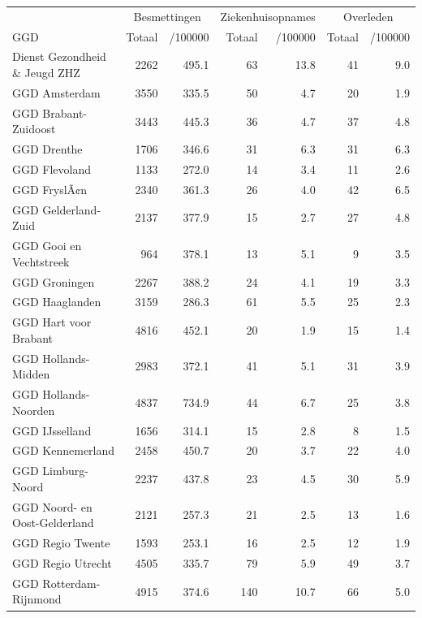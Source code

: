 \documentclass[
  english,
  man,floatsintext]{apa6}
\begin{document}
\begin{table}
\centering\begingroup\fontsize{10}{12}\selectfont

\begin{threeparttable}
\begin{tabular}{lrrrrrr}
\toprule
\multicolumn{1}{c}{ } & \multicolumn{2}{c}{Besmettingen} & \multicolumn{2}{c}{Ziekenhuisopnames} & \multicolumn{2}{c}{Overleden} \\
\cmidrule(l{3pt}r{3pt}){2-3} \cmidrule(l{3pt}r{3pt}){4-5} \cmidrule(l{3pt}r{3pt}){6-7}
GGD & Totaal & /100000 & Totaal & /100000 & Totaal & /100000\\
\midrule
Dienst Gezondheid \& Jeugd ZHZ & 2262 & 495.1 & 63 & 13.8 & 41 & 9.0\\
GGD Amsterdam & 3550 & 335.5 & 50 & 4.7 & 20 & 1.9\\
GGD Brabant-Zuidoost & 3443 & 445.3 & 36 & 4.7 & 37 & 4.8\\
GGD Drenthe & 1706 & 346.6 & 31 & 6.3 & 31 & 6.3\\
GGD Flevoland & 1133 & 272.0 & 14 & 3.4 & 11 & 2.6\\
GGD FryslÃ¢n & 2340 & 361.3 & 26 & 4.0 & 42 & 6.5\\
GGD Gelderland-Zuid & 2137 & 377.9 & 15 & 2.7 & 27 & 4.8\\
GGD Gooi en Vechtstreek & 964 & 378.1 & 13 & 5.1 & 9 & 3.5\\
GGD Groningen & 2267 & 388.2 & 24 & 4.1 & 19 & 3.3\\
GGD Haaglanden & 3159 & 286.3 & 61 & 5.5 & 25 & 2.3\\
GGD Hart voor Brabant & 4816 & 452.1 & 20 & 1.9 & 15 & 1.4\\
GGD Hollands-Midden & 2983 & 372.1 & 41 & 5.1 & 31 & 3.9\\
GGD Hollands-Noorden & 4837 & 734.9 & 44 & 6.7 & 25 & 3.8\\
GGD IJsselland & 1656 & 314.1 & 15 & 2.8 & 8 & 1.5\\
GGD Kennemerland & 2458 & 450.7 & 20 & 3.7 & 22 & 4.0\\
GGD Limburg-Noord & 2237 & 437.8 & 23 & 4.5 & 30 & 5.9\\
GGD Noord- en Oost-Gelderland & 2121 & 257.3 & 21 & 2.5 & 13 & 1.6\\
GGD Regio Twente & 1593 & 253.1 & 16 & 2.5 & 12 & 1.9\\
GGD Regio Utrecht & 4505 & 335.7 & 79 & 5.9 & 49 & 3.7\\
GGD Rotterdam-Rijnmond & 4915 & 374.6 & 140 & 10.7 & 66 & 5.0\\

\end{tabular}
\end{threeparttable}
\end{table}
\end{document}
